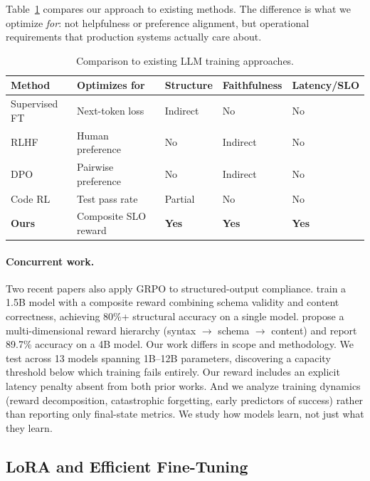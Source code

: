 \documentclass[11pt]{article}
\begin{document}
Table~\ref{tab:method-comparison} compares our approach to existing methods.
The difference is what we optimize \emph{for}: not helpfulness or preference alignment, but operational requirements that production systems actually care about.

\begin{table}[t]
\centering
\caption{Comparison to existing LLM training approaches.}
\label{tab:method-comparison}
\small
\begin{tabular}{@{}p{2.8cm}p{2.2cm}p{2.2cm}p{2.0cm}p{2.5cm}@{}}
\toprule
\textbf{Method} & \textbf{Optimizes for} & \textbf{Structure} & \textbf{Faithfulness} & \textbf{Latency/SLO} \\
\midrule
Supervised FT & Next-token loss & Indirect & No & No \\
RLHF~\citep{ouyang2022rlhf} & Human preference & No & Indirect & No \\
DPO~\citep{rafailov2023dpo} & Pairwise preference & No & Indirect & No \\
Code RL~\citep{coderl2022} & Test pass rate & Partial & No & No \\
\textbf{Ours} & Composite SLO reward & \textbf{Yes} & \textbf{Yes} & \textbf{Yes} \\
\bottomrule
\end{tabular}
\end{table}

\paragraph{Concurrent work.}
Two recent papers also apply GRPO to structured-output compliance.
\citet{agarwal2025thinkjson} train a 1.5B model with a composite reward combining schema validity and content correctness, achieving 80\%+ structural accuracy on a single model.
\citet{hu2025rlstruct} propose a multi-dimensional reward hierarchy (syntax $\to$ schema $\to$ content) and report 89.7\% accuracy on a 4B model.
Our work differs in scope and methodology.  We test across 13 models spanning 1B--12B parameters, discovering a capacity threshold below which training fails entirely.  Our reward includes an explicit latency penalty absent from both prior works.  And we analyze training dynamics (reward decomposition, catastrophic forgetting, early predictors of success) rather than reporting only final-state metrics.  We study how models learn, not just what they learn.

\subsection{LoRA and Efficient Fine-Tuning}
\end{document}
